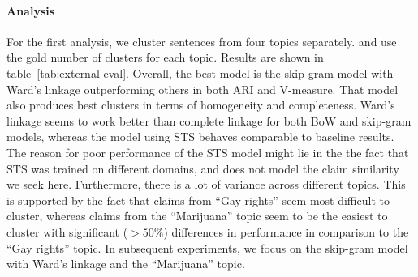 \paragraph{Analysis } 
For the first analysis, we cluster sentences from four topics separately. 
and use the gold number of clusters for each topic. 
Results are shown in table~\ref{tab:external-eval}. 
Overall, the best model is the skip-gram model with Ward's linkage 
outperforming others in both ARI and V-measure. 
That model also produces best clusters in terms of homogeneity and 
completeness. 
Ward's linkage seems to work better than complete linkage for both BoW and
skip-gram models, whereas the model using STS behaves comparable to baseline results. 
The reason for poor performance of the STS model might lie in the
the fact that STS was trained 
on different domains, and does not model the claim similarity we seek here.  
Furthermore, there is a lot of variance across different topics. 
This is supported by the fact that claims from ``Gay rights'' seem most
difficult to cluster, whereas claims from the 
``Marijuana'' topic seem to be the easiest to cluster with significant ($>50\%$) differences
in performance in comparison to the ``Gay rights'' topic.
In subsequent experiments, we focus on the skip-gram model 
with Ward's linkage and the ``Marijuana'' topic. 

